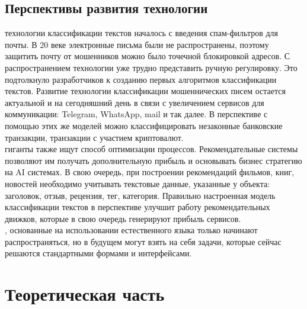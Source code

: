 \documentclass{article}
\newcommand\tab[1][1cm]{\hspace*{#1}}
\begin{document}
\subsection{Перспективы развития технологии}
 технологии классификации текстов началось с введения спам-фильтров для почты. В 20 веке электронные письма были не распространены, поэтому защитить почту от мошенников можно было точечной блокировкой адресов. С распространением технологии уже трудно представить ручную регулировку. Это подтолкнуло разработчиков к созданию первых алгоритмов классификации текстов. Развитие технологии классификации мошеннических писем остается актуальной и на сегодняшний день в связи с увеличением сервисов для коммуникации: Telegram, WhatsApp, mail и так далее. В перспективе с помощью этих же моделей можно классифицировать незаконные банковские транзакции, транзакции с участием криптовалют.\\
 гиганты также ищут способ оптимизации процессов. Рекомендательные системы позволяют им получать дополнительную прибыль и основывать бизнес стратегию на AI системах. В свою очередь, при построении рекомендаций фильмов, книг, новостей необходимо учитывать текстовые данные, указанные у объекта: заголовок, отзыв, рецензия, тег, категория. Правильно настроенная модель классификации текстов в перспективе улучшит работу рекомендательных движков, которые в свою очередь генерируют прибыль сервисов.\\
, основанные на использовании естественного языка только начинают распространяться, но в будущем могут взять на себя задачи, которые сейчас решаются стандартными формами и  интерфейсами.\\
\newpage
\section{Теоретическая часть} 
\end{document}
